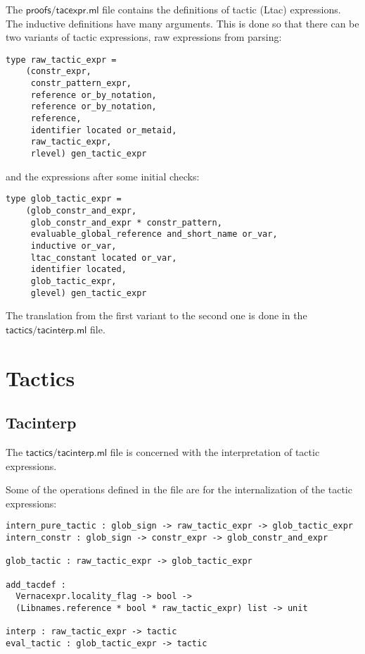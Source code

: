 \documentclass[a4paper,oneside]{book}
\newcommand{\m}[1]{\ensuremath{\mathsf{#1}}}
\begin{document}
The \m{proofs/tacexpr.ml} file contains the definitions of tactic
(Ltac) expressions. The inductive definitions have many
arguments. This is done so that there can be two variants of tactic
expressions, raw expressions from parsing:
\begin{lstlisting}
type raw_tactic_expr =
    (constr_expr,
     constr_pattern_expr,
     reference or_by_notation,
     reference or_by_notation,
     reference,
     identifier located or_metaid,
     raw_tactic_expr,
     rlevel) gen_tactic_expr
\end{lstlisting}
and the expressions after some initial checks:
\begin{lstlisting}
type glob_tactic_expr =
    (glob_constr_and_expr,
     glob_constr_and_expr * constr_pattern,
     evaluable_global_reference and_short_name or_var,
     inductive or_var,
     ltac_constant located or_var,
     identifier located,
     glob_tactic_expr,
     glevel) gen_tactic_expr
\end{lstlisting}

The translation from the first variant to the second one is done in
the \m{tactics/tacinterp.ml} file.

\newpage

\section{Tactics}

\subsection{Tacinterp}

The \m{tactics/tacinterp.ml} file is concerned with the interpretation
of tactic expressions.

Some of the operations defined in the file are for the internalization
of the tactic expressions:

\begin{lstlisting}
intern_pure_tactic : glob_sign -> raw_tactic_expr -> glob_tactic_expr
intern_constr : glob_sign -> constr_expr -> glob_constr_and_expr

glob_tactic : raw_tactic_expr -> glob_tactic_expr

add_tacdef :
  Vernacexpr.locality_flag -> bool ->
  (Libnames.reference * bool * raw_tactic_expr) list -> unit

interp : raw_tactic_expr -> tactic
eval_tactic : glob_tactic_expr -> tactic
\end{lstlisting}
\end{document}
